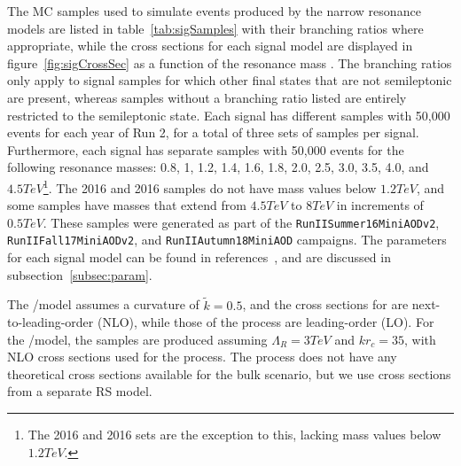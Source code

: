 The MC samples used to simulate events produced by the narrow resonance models are listed in table~\ref{tab:sigSamples} with their branching ratios where appropriate, while the cross sections for each signal model are displayed in figure~\ref{fig:sigCrossSec} as a function of the resonance mass \MX.
The branching ratios only apply to signal samples for which other final states that are not semileptonic are present, whereas samples without a branching ratio listed are entirely restricted to the semileptonic state.
Each signal has different samples with 50,000 events for each year of Run 2, for a total of three sets of samples per signal.
Furthermore, each signal has separate samples with 50,000 events for the following resonance masses: 0.8, 1, 1.2, 1.4, 1.6, 1.8, 2.0, 2.5, 3.0, 3.5, 4.0, and $4.5\unit{TeV}$\footnote{The 2016 \VBF\ZprtoWW and 2016 \VBF\WprtoWZ sets are the exception to this, lacking mass values below $1.2\unit{TeV}$.}.
The 2016 \VBF\ZprtoWW and 2016 \VBF\WprtoWZ samples do not have mass values below $1.2\unit{TeV}$, and some samples have masses that extend from $4.5\unit{TeV}$ to $8\unit{TeV}$ in increments of $0.5\unit{TeV}$.
These samples were generated as part of the \texttt{RunIISummer16MiniAODv2}, \texttt{RunIIFall17MiniAODv2}, and \texttt{RunIIAutumn18MiniAOD} campaigns.
The parameters for each signal model can be found in references~\cite{git:BulkGrav_WW,git:Wpr_WZ,git:Wpr_WH,git:VBFRad_WW}, and are discussed in subsection~\ref{subsec:param}.

The \ggF/\VBF\GBulktoWW model assumes a curvature of $\tilde{k}=0.5$, and the cross sections for \ggF\GBulktoWW are next-to-leading-order (NLO), while those of the \VBF process are leading-order (LO).
For the \ggF/\VBF\RadtoWW model, the samples are produced assuming $\Lambda_{R}=3\unit{TeV}$ and $kr_c=35$, with NLO cross sections used for the \ggF process.
The \VBF process does not have any theoretical cross sections available for the bulk scenario, but we use cross sections from a separate RS model.

